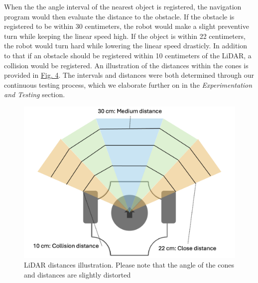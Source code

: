 \documentclass[conference]{IEEEtran}
\begin{document}
When the the angle interval of the nearest object is registered, the navigation program would then evaluate the distance to the obstacle.
If the obstacle is registered to be within 30 centimeters, the robot would make a slight preventive turn while keeping the linear speed high.
If the object is within 22 centimeters, the robot would turn hard while lowering the linear speed drasticly.
In addition to that if an obstacle should be registered within 10 centimeters of the LiDAR, a collision would be registered.
An illustration of the distances within the cones is provided in \href{sec:distances}{Fig. 4}.
The intervals and distances were both determined through our continuous testing process, which we elaborate further on in the \textit{Experimentation and Testing} section.
\begin{figure}[htbp]
    \centerline{\includegraphics[width=0.9\columnwidth]{Pictures/LiDAR Distances.png}}
    \caption{LiDAR distances illustration. Please note that the angle of the cones and distances are slightly distorted}
    \label{sec:distances}
    \end{figure}
\end{document}
